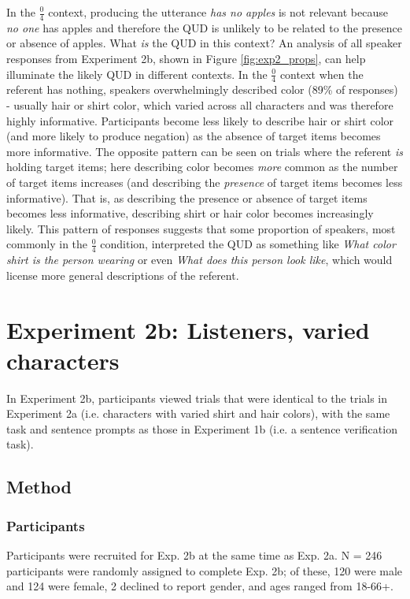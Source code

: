 \documentclass[man, floatsintext, noapacite]{apa6}
\begin{document}
In the $\frac{0}{4}$ context, producing the utterance \textit{has no apples} is not relevant because \textit{no one} has apples and therefore the QUD is unlikely to be related to the presence or absence of apples. What \textit{is} the QUD in this context? An analysis of all speaker responses from Experiment 2b, shown in Figure \ref{fig:exp2_props}, can help illuminate the likely QUD in different contexts. In the $\frac{0}{4}$ context when the referent has nothing, speakers overwhelmingly described color (89\% of responses) - usually hair or shirt color, which varied across all characters and was therefore highly informative. Participants become less likely to describe hair or shirt color (and more likely to produce negation) as the absence of target items becomes more informative. The opposite pattern can be seen on trials where the referent \textit{is} holding target items; here describing color becomes \textit{more} common as the number of target items increases (and describing the \textit{presence} of target items becomes less informative). That is, as describing the presence or absence of target items becomes less informative, describing shirt or hair color becomes increasingly likely. This pattern of responses suggests that some proportion of speakers, most commonly in the $\frac{0}{4}$ condition, interpreted the QUD as something like \textit{What color shirt is the person wearing} or even \textit{What does this person look like}, which would license more general descriptions of the referent.  

\section{Experiment 2b: Listeners, varied characters}

In Experiment 2b, participants viewed trials that were identical to the trials in Experiment 2a (i.e. characters with varied shirt and hair colors), with the same task and sentence prompts as those in Experiment 1b (i.e. a sentence verification task). 

\subsection{Method}

\subsubsection{Participants} 

Participants were recruited for Exp. 2b at the same time as Exp. 2a. N = 246 participants were randomly assigned to complete Exp. 2b; of these, 120 were male and 124 were female, 2 declined to report gender, and ages ranged from 18-66+.
\end{document}
